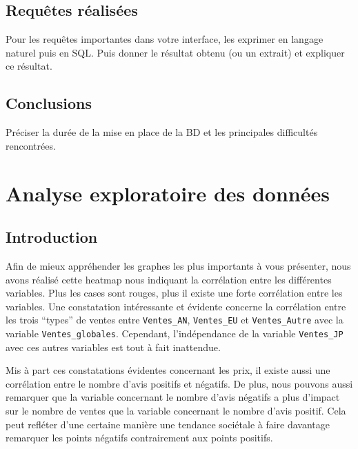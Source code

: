 \documentclass[mstat,12pt]{unswthesis}
\begin{document}
\hypertarget{requuxeates-ruxe9alisuxe9es}{%
\section{Requêtes réalisées}\label{requuxeates-ruxe9alisuxe9es}}

Pour les requêtes importantes dans votre interface, les exprimer en langage naturel puis en SQL. Puis
donner le résultat obtenu (ou un extrait) et expliquer ce résultat.


\hypertarget{concluBD}{%
\section{Conclusions}\label{concluBD}}

Préciser la durée de la mise en place de la BD et les  principales difficultés rencontrées.

\normalsize


\hypertarget{Analyse-exploratoire-des-données}{%
\chapter{Analyse exploratoire des données}\label{AnalyseExploratoireDesDonnées}}

\hypertarget{IntroductionAnalyseExploratoireDesDonnées}{%
\section{Introduction}\label{IntroAnalyseExploratoireDesDonnées}}

Afin de mieux appréhender les graphes les plus importants à vous présenter, nous avons réalisé cette heatmap nous indiquant la corrélation entre les différentes variables. Plus les cases sont rouges, plus il existe une forte corrélation entre les variables. Une constatation intéressante et évidente concerne la corrélation entre les trois ``types'' de ventes entre \texttt{Ventes\_AN}, \texttt{Ventes\_EU} et \texttt{Ventes\_Autre} avec la variable \texttt{Ventes\_globales}. Cependant, l’indépendance de la variable \texttt{Ventes\_JP} avec ces autres variables est tout à fait inattendue. 

Mis à part ces constatations évidentes concernant les prix, il existe aussi une corrélation entre le nombre d’avis positifs et négatifs. De plus, nous pouvons aussi remarquer que la variable concernant le nombre d’avis négatifs a plus d’impact sur le nombre de ventes que la variable concernant le nombre d’avis positif. Cela peut refléter d’une certaine manière une tendance sociétale à faire davantage remarquer les points négatifs contrairement aux points positifs.
\end{document}
